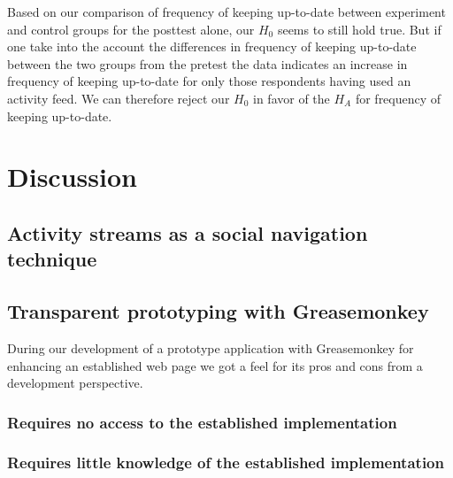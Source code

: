 \parabreak

Based on our comparison of frequency of keeping up-to-date between experiment
and control groups for the posttest alone, our $H_0$ seems to still hold true.
But if one take into the account the differences in frequency of keeping
up-to-date between the two groups from the pretest the data indicates
an increase in frequency of keeping up-to-date for only those respondents
having used an activity feed. We can therefore reject our $H_0$ in favor
of the $H_A$ for frequency of keeping up-to-date.

























\clearpage
\clearpage

\section{Discussion}

\subsection{Activity streams as a social navigation technique}

\subsection{Transparent prototyping with Greasemonkey}

During our development of a prototype application with Greasemonkey for
enhancing an established web page we got a feel for its pros and cons from a
development perspective.

\subsubsection{Requires no access to the established implementation}

\subsubsection{Requires little knowledge of the established implementation}

